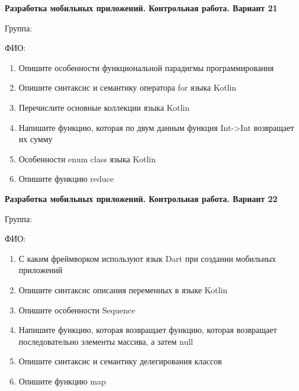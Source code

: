 \documentclass[12pt]{article}
\begin{document}
\newpage\begin{minipage}{\textwidth}
\textbf{Разработка мобильных приложений. Контрольная работа. Вариант 21}

Группа: \underline{\hspace{3cm}}

ФИО: \underline{\hspace{10cm}}

\begin{enumerate}
\item Опишите особенности функциональной парадигмы программирования
\item Опишите синтаксис и семантику оператора for языка Kotlin
\item Перечислите основные коллекции языка Kotlin
\item Напишите функцию, которая по двум данным функция Int->Int возвращает их сумму
\item Особенности enum class языка Kotlin
\item Опишите функцию reduce

\end{enumerate}
\end{minipage}

\newpage\begin{minipage}{\textwidth}
\textbf{Разработка мобильных приложений. Контрольная работа. Вариант 22}

Группа: \underline{\hspace{3cm}}

ФИО: \underline{\hspace{10cm}}

\begin{enumerate}
\item С каким фреймворком используют язык Dart при создании мобильных приложений
\item Опишите синтаксис описания переменных в языке Kotlin
\item Опишите особенности Sequence
\item Напишите функцию, которая возвращает функцию, которая возвращает последовательно элементы массива, а затем null
\item Опишите синтаксис и семантику делегирования классов
\item Опишите функцию map

\end{enumerate}
\end{minipage}
\end{document}
